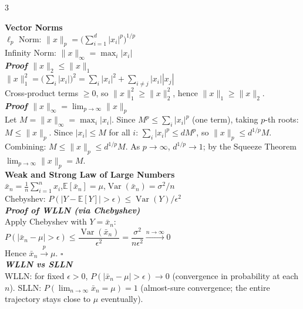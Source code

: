 \documentclass[a4paper,7pt]{article}
\begin{document}
\tiny
\begin{multicols*}{3}

\textbf{Vector Norms}\\
$\ell_p$ Norm: $\|x\|_p=\bigl(\sum^d_{i=1}|x_i|^p\bigr)^{1/p}$\\
Infinity Norm: $\|x\|_\infty = \max_i |x_i|$\\

\textit{\textbf{Proof $\|x\|_2 \leq \|x\|_1$}}\\
$\|x\|_1^2=\bigl(\sum_i|x_i|\bigr)^2=\sum_i|x_i|^2+\sum_{i\neq j}|x_i||x_j|$\\
Cross-product terms $\geq 0$, so $\|x\|_1^2\geq\|x\|_2^2$, hence $\|x\|_1\geq\|x\|_2$.\\

\textit{\textbf{Proof $\|x\|_\infty=\lim_{p\to\infty}\|x\|_p$}}\\
Let $M=\|x\|_\infty=\max_i|x_i|$. Since $M^p\leq\sum_i|x_i|^p$ (one term), taking $p$-th roots: $M\leq\|x\|_p$. Since $|x_i|\leq M$ for all $i$: $\sum_i|x_i|^p\leq dM^p$, so $\|x\|_p\leq d^{1/p}M$. Combining: $M\leq\|x\|_p\leq d^{1/p}M$. As $p\to\infty$, $d^{1/p}\to 1$; by the Squeeze Theorem $\lim_{p\to\infty}\|x\|_p=M$.\\

\textbf{Weak and Strong Law of Large Numbers}\\
$\bar x_n=\frac{1}{n}\sum_{i=1}^n x_i$,\quad $\mathbb{E}[\bar x_n]=\mu$,\quad $\operatorname{Var}(\bar x_n)=\sigma^2/n$\\
Chebyshev: $P(|Y-\mathbb{E}[Y]|>\epsilon)\leq\operatorname{Var}(Y)/\epsilon^2$\\

\textit{\textbf{Proof of WLLN (via Chebyshev)}}\\
Apply Chebyshev with $Y=\bar x_n$:\\
$P(|\bar x_n-\mu|>\epsilon)\leq\dfrac{\operatorname{Var}(\bar x_n)}{\epsilon^2}=\dfrac{\sigma^2}{n\epsilon^2}\xrightarrow{n\to\infty}0$\\
Hence $\bar x_n\xrightarrow{p}\mu$. \hfill$\square$\\

\textit{\textbf{WLLN vs SLLN}}\\
WLLN: for fixed $\epsilon>0$, $P(|\bar x_n-\mu|>\epsilon)\to 0$ (convergence in probability at each $n$). SLLN: $P(\lim_{n\to\infty}\bar x_n=\mu)=1$ (almost-sure convergence; the entire trajectory stays close to $\mu$ eventually).\\


\end{multicols*}
\end{document}

